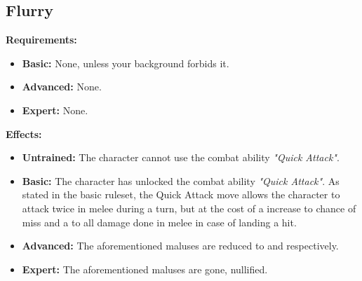 \subsection{Flurry}
\begin{table}[!ht]
\centering
{}
\end{table}
\textbf{Requirements:}
\begin{itemize}
	\item \textbf{Basic:} None, unless your background forbids it.
	\item \textbf{Advanced:} None.
	\item \textbf{Expert:} None.
\end{itemize}
\textbf{Effects:}
\begin{itemize}
	\item \textbf{Untrained:} The character cannot use the combat ability \textit{"Quick Attack"}.
	\item \textbf{Basic:} The character has unlocked the combat ability \textit{"Quick Attack"}. As stated in the basic ruleset, the Quick Attack move allows the character to attack twice in melee during a turn, but at the cost of a  increase to chance of miss and a  to all damage done in melee in case of landing a hit.
	\item \textbf{Advanced:} The aforementioned maluses are reduced to  and  respectively.
	\item \textbf{Expert:} The aforementioned maluses are gone, nullified.
\end{itemize}\newpage
